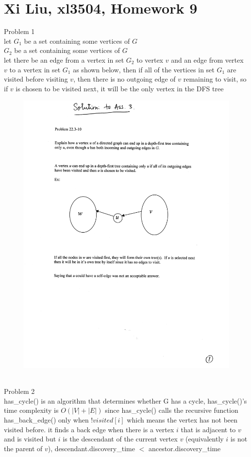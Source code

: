 \documentclass[12pt,border=4pt,multi]{article} %
\begin{document}
\section*{Xi Liu, xl3504, Homework 9}
Problem 1\\
let $G_1$ be a set containing some vertices of $G$\\
    $G_2$ be a set containing some vertices of $G$\\
let there be an edge from a vertex in set $G_2$ to vertex $v$ and an edge from vertex $v$ to a vertex in set $G_1$ as shown below, then if all of the vertices in set $G_1$ are visited before visiting $v$, then there is no outgoing edge of $v$ remaining to visit, so if $v$ is chosen to be visited next, it will be the only vertex in the DFS tree\\
\begin{figure}[h!]
	\centering
	\includegraphics[width=1.1\textwidth, height=0.55\textwidth]{1} %
\end{figure}\\
\newpage
\noindent
Problem 2\\
has\_cycle() is an algorithm that determines whether G has a
cycle, has\_cycle()'s time complexity is $O(|V| + |E|)$ since has\_cycle() calls the recursive function has\_back\_edge() only when $!visited[i]$ which means the vertex has not been visited before. it finds a back edge when there is a vertex $i$ that is adjacent to $v$ and is visited but $i$ is the descendant of the current vertex $v$ (equivalently $i$ is not the parent of $v$), descendant.discovery\_time $<$ ancestor.discovery\_time \\
\end{document}
